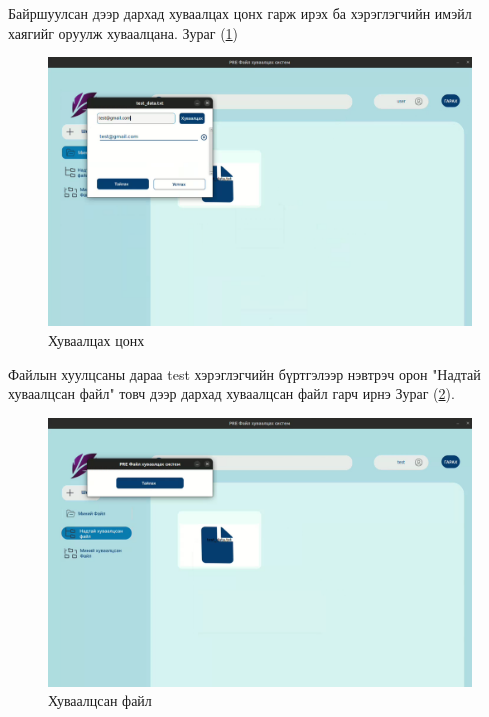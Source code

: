 Байршуулсан дээр дархад хуваалцах цонх гарж ирэх ба хэрэглэгчийн имэйл хаягийг оруулж хуваалцана. Зураг (\ref{fig:share_example})
\begin{figure}[H]
    \centering
    \includegraphics[scale=0.32]{Figures/example/share.png}
    \caption{Хуваалцах цонх}
    \label{fig:share_example}
\end{figure}
Файлын хуулцсаны дараа test хэрэглэгчийн бүртгэлээр нэвтрэч орон "Надтай хуваалцсан файл" товч дээр дархад хуваалцсан файл гарч ирнэ Зураг (\ref{fig:shared_file}).

\begin{figure}[H]
    \centering
    \includegraphics[scale=0.32]{Figures/example/shared_file.png}
    \caption{Хуваалцсан файл}
    \label{fig:shared_file}
\end{figure}

